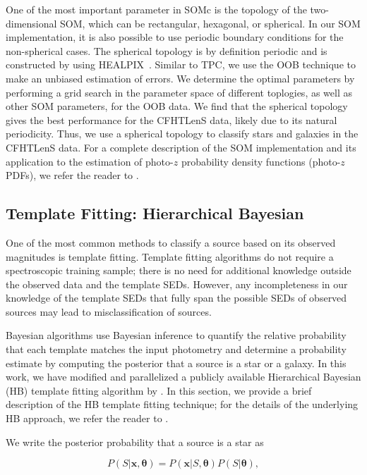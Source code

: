 One of the most important parameter in SOMc
is the topology of the two-dimensional SOM,
which can be rectangular, hexagonal, or spherical.
In our SOM implementation, it is also possible
to use periodic boundary conditions for the non-spherical cases.
The spherical topology is by definition periodic and
is constructed by using
\textsc{HEALPIX}~\citep{gorski2005healpix}.
Similar to TPC,
we use the OOB technique to make an unbiased estimation of errors.
We determine the optimal parameters by performing
a grid search in the parameter space of different toplogies,
as well as other SOM parameters, for the OOB data.
We find that the spherical topology gives the best performance
for the CFHTLenS data, likely due to its natural periodicity.
Thus, we use a spherical topology to classify stars and galaxies
in the CFHTLenS data.
For a complete description of the SOM implementation
and its application to the estimation of
photo-$z$ probability density functions (photo-$z$ PDFs),
we refer the reader to \cite{carrascokind2014somz}.

\subsection{Template Fitting: Hierarchical Bayesian}

One of the most common methods to classify a source
based on its observed magnitudes is template fitting.
Template fitting algorithms do not require a spectroscopic training sample;
there is no need for additional knowledge outside the
observed data and the template SEDs.
However, any incompleteness in our knowledge of the template SEDs
that fully span the possible SEDs of observed sources
may lead to misclassification of sources.

Bayesian algorithms use Bayesian inference to quantify
the relative probability that each template matches
the input photometry
and determine a probability estimate by computing
the posterior that a source is a star or a galaxy.
In this work, we have modified and parallelized
a publicly available Hierarchical Bayesian (HB) template fitting
algorithm by \cite{Fadely2012}.
In this section, we provide a brief description
of the HB template fitting technique;
for the details of the underlying HB approach,
we refer the reader to \cite{Fadely2012}.

We write the posterior probability that a source is a star as

\begin{equation} \label{eq:overall_posterior}
P \left( S | \mathbf{x}, \mathbf{\theta} \right)
= P \left( \mathbf{x} | S, \mathbf{\theta} \right)
P \left( S | \mathbf{\theta} \right),
\end{equation}

